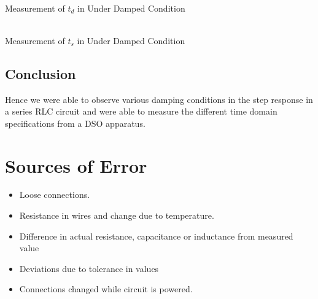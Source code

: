 \documentclass{article}
\begin{document}
\begin{multicols}{2}
\begin{center}
 \\ \vspace{5px}
Measurement of $t_d$ in Under Damped Condition \\

\columnbreak

 \\ \vspace{5px}
Measurement of $t_s$ in Under Damped Condition
\end{center}
\end{multicols}

\subsection{Conclusion}
Hence we were able to observe various damping conditions in the step response in a series RLC circuit and were able to measure the different time domain specifications from a DSO apparatus.

\newpage



\section{Sources of Error}
\begin{itemize}
\item Loose connections.
\item Resistance in wires and change due to temperature.
\item Difference in actual resistance, capacitance or inductance from measured value
\item Deviations due to tolerance in values
\item Connections changed while circuit is powered.
\end{itemize}
\end{document}
